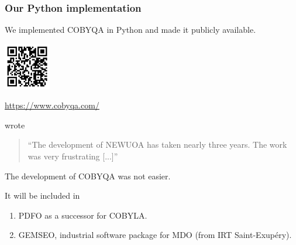 \documentclass{polyu-presentation}
\begin{document}
\begin{frame}
    \frametitle{Our Python implementation}

    We implemented COBYQA in \alert{Python} and made it \alert{publicly available}.
    
	\begin{center}
        \href{https://www.cobyqa.com/}{\includegraphics[width=0.8in]{images/qr/cobyqa.png}}

        \scriptsize\url{https://www.cobyqa.com/}
    \end{center}

    \begin{block}{}
        \textcite{Powell_2006} wrote
        \begin{quote}
            \enquote{The development of NEWUOA has taken nearly \alert{three years}. The work was very \alert{frustrating} [...]}
        \end{quote}
        The development of COBYQA was not easier.
    \end{block}

    It will be included in
    \begin{enumerate}
        \item PDFO as a successor for COBYLA.
        \item GEMSEO, industrial software package for \alert{MDO} (from IRT Saint-Exup{\'{e}}ry).
    \end{enumerate}
\end{frame}
\end{document}
